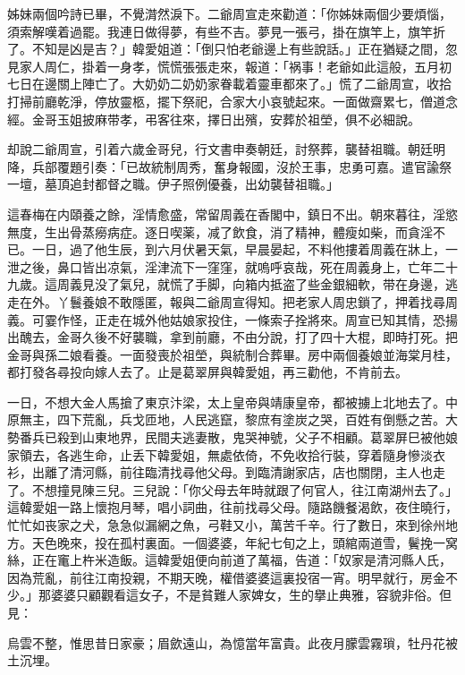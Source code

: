 姊妹兩個吟詩已畢，不覺潸然淚下。二爺周宣走來勸道：「你姊妹兩個少要煩惱，須索解嘆着過罷。我連日做得夢，有些不吉。夢見一張弓，掛在旗竿上，旗竿折了。不知是凶是吉？」韓愛姐道：「倒只怕老爺邊上有些說話。」正在猶疑之間，忽見家人周仁，掛着一身孝，慌慌張張走來，報道：「祸事！老爺如此這般，五月初七日在邊關上陣亡了。大奶奶二奶奶家眷載着靈車都來了。」慌了二爺周宣，收拾打掃前廳乾淨，停放靈柩，擺下祭祀，合家大小哀號起來。一面做齋累七，僧道念經。金哥玉姐披麻带孝，弔客往來，擇日出殯，安葬於祖塋，俱不必細說。

却說二爺周宣，引着六歲金哥兒，行文書申奏朝廷，討祭葬，襲替祖職。朝廷明降，兵部覆題引奏：「已故統制周秀，奮身報國，沒於王事，忠勇可嘉。遣官諭祭一壇，墓頂追封都督之職。伊子照例優養，出幼襲替祖職。」

這春梅在内頤養之餘，淫情愈盛，常留周義在香閣中，鎮日不出。朝來暮往，淫慾無度，生出骨蒸癆病症。逐日喫薬，减了飲食，消了精神，體瘦如柴，而貪淫不已。一日，過了他生辰，到六月伏暑天氣，早晨晏起，不料他摟着周義在牀上，一泄之後，鼻口皆出凉氣，淫津流下一窪窪，就嗚呼哀哉，死在周義身上，亡年二十九歲。這周義見没了氣兒，就慌了手脚，向箱内抵盗了些金銀細軟，带在身邊，逃走在外。丫鬟養娘不敢隱匿，報與二爺周宣得知。把老家人周忠鎖了，押着找尋周義。可霎作怪，正走在城外他姑娘家投住，一條索子拴將來。周宣已知其情，恐揚出醜去，金哥久後不好襲職，拿到前廳，不由分說，打了四十大棍，即時打死。把金哥與孫二娘看養。一面發喪於祖塋，與統制合葬畢。房中兩個養娘並海棠月桂，都打發各尋投向嫁人去了。止是葛翠屏與韓愛姐，再三勸他，不肯前去。

一日，不想大金人馬搶了東京汴梁，太上皇帝與靖康皇帝，都被擄上北地去了。中原無主，四下荒亂，兵戈匝地，人民逃竄，黎庶有塗炭之哭，百姓有倒懸之苦。大勢番兵已殺到山東地界，民間夫逃妻散，鬼哭神號，父子不相顧。葛翠屏巳被他娘家領去，各逃生命，止丢下韓愛姐，無處依倚，不免收拾行裝，穿着隨身慘淡衣衫，出離了清河縣，前往臨清找尋他父母。到臨清謝家店，店也關閉，主人也走了。不想撞見陳三兒。三兒說：「你父母去年時就跟了何官人，往江南湖州去了。」這韓愛姐一路上懷抱月琴，唱小詞曲，往前找尋父母。隨路饑餐渴飲，夜住曉行，忙忙如丧家之犬，急急似漏網之魚，弓鞋又小，萬苦千辛。行了數日，來到徐州地方。天色晚來，投在孤村裏面。一個婆婆，年紀七旬之上，頭綰兩道雪，鬢挽一窝絲，正在竃上杵米造飯。這韓愛姐便向前道了萬福，告道：「奴家是清河縣人氏，因為荒亂，前往江南投親，不期天晚，權借婆婆這裏投宿一宵。明早就行，房金不少。」那婆婆只顧觀看這女子，不是貧難人家婢女，生的擧止典雅，容貌非俗。但見：
\begin{myquote}
烏雲不整，惟思昔日家豪；眉歛遠山，為憶當年富貴。此夜月朦雲霧瑣，牡丹花被土沉埋。
\end{myquote}

